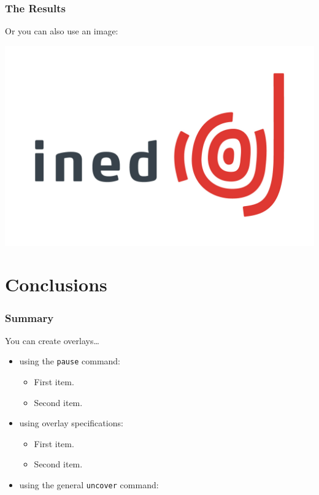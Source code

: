 \documentclass[11pt]{beamer}
\begin{document}
\begin{frame}          %
\frametitle{The Results}
Or you can also use an image: 
\bigskip
\begin{center}
\includegraphics[scale=.5]{Ined_logo.jpg}
\end{center}
\end{frame}

\section{Conclusions}   %

\begin{frame}          %
\frametitle{Summary}
You can create overlays\dots
\begin{itemize}
	\item using the \texttt{pause} command:
	\begin{itemize}
		\item
		First item.
		\pause
		\item    
		Second item.
	\end{itemize}
	\item
	using overlay specifications:
	\begin{itemize}
		\item<3->
		First item.
		\item<4->
		Second item.
	\end{itemize}
	\item
	using the general \texttt{uncover} command:
	\begin{itemize}
	\end{itemize}
\end{itemize}
\end{frame}
\end{document}
